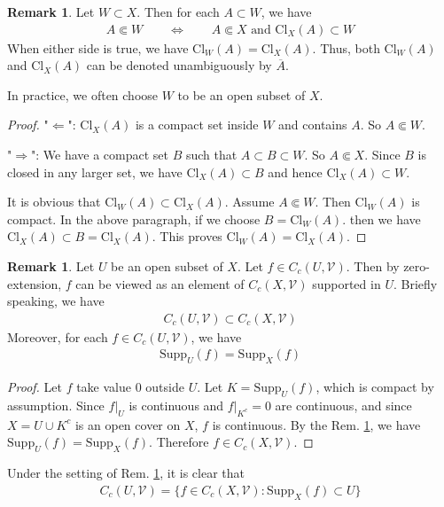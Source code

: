 \documentclass[12pt,b5paper,notitlepage]{article}
\theoremstyle{definition}
\newtheorem{rem}[df]{Remark}
\theoremstyle{plain}
\newcommand{\mc}{\mathcal}
\newcommand{\ovl}{\overline}
\newcommand{\Supp}{\mathrm{Supp}}
\newcommand{\Cl}{\mathrm{Cl}}
\numberwithin{equation}{section}
\begin{document}
\begin{rem}\label{lb1}
Let $W\subset X$. Then for each $A\subset W$, we have 
\begin{align*}
A\Subset W\qquad\Longleftrightarrow\qquad A\Subset X\text{ and }\Cl_X(A)\subset W
\end{align*}
When either side is true, we have $\Cl_W(A)=\Cl_X(A)$. Thus, both $\Cl_W(A)$ and $\Cl_X(A)$ can be denoted unambiguously by $\ovl A$.
\end{rem}

In practice, we often choose $W$ to be an open subset of $X$.

\begin{proof}
"$\Leftarrow$": $\Cl_X(A)$ is a compact set inside $W$ and contains $A$. So $A\Subset W$.

"$\Rightarrow$": We have a compact set $B$ such that $A\subset B\subset W$. So $A\Subset X$. Since $B$ is closed in any larger set, we have $\Cl_X(A)\subset B$ and hence $\Cl_X(A)\subset W$.

It is obvious that $\Cl_W(A)\subset\Cl_X(A)$. Assume $A\Subset W$. Then $\Cl_W(A)$ is compact. In the above paragraph, if we choose $B=\Cl_W(A)$. then we have $\Cl_X(A)\subset B=\Cl_X(A)$. This proves $\Cl_W(A)=\Cl_X(A)$.
\end{proof}

\begin{rem}\label{lb2}
Let $U$ be an open subset of $X$. Let $f\in C_c(U,\mc V)$. Then by zero-extension, $f$ can be viewed as an element of $C_c(X,\mc V)$ supported in $U$. Briefly speaking, we have
\begin{align*}
C_c(U,\mc V)\subset C_c(X,\mc V)
\end{align*}
Moreover, for each $f\in C_c(U,\mc V)$, we have
\begin{align*}
\Supp_U(f)=\Supp_X(f)
\end{align*}
\end{rem}

\begin{proof}
Let $f$ take value $0$ outside $U$. Let $K=\Supp_U(f)$, which is compact by assumption. Since $f|_U$ is continuous and $f|_{K^c}=0$ are continuous, and since $X=U\cup K^c$ is an open cover on $X$, $f$ is continuous. By the Rem. \ref{lb1}, we have $\Supp_U(f)=\Supp_X(f)$. Therefore $f\in C_c(X,\mc V)$.
\end{proof}


Under the setting of Rem. \ref{lb2}, it is clear that
\begin{align}
C_c(U,\mc V)=\{f\in C_c(X,\mc V):\Supp_X(f)\subset U\}
\end{align}
\end{document}
